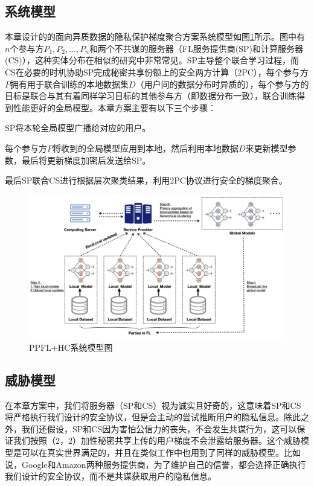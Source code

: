 \subsection{系统模型}
本章设计的的面向异质数据的隐私保护梯度聚合方案系统模型如图\ref{sysjpg}所示。图中有$n$个参与方$P_1,P_2,...,P_n$和两个不共谋的服务器（FL服务提供商(SP)和计算服务器(CS)），这种实体分布在相似的研究\cite{liu2021privacy, dong2021flod, hao2021efficient}中非常常见。SP主导整个联合学习过程，而CS在必要的时机协助SP完成秘密共享份额上的安全两方计算（2PC），每个参与方$P$拥有用于联合训练的本地数据集$D$（用户间的数据分布时异质的），每个参与方的目标是联合与其有着同样学习目标的其他参与方（即数据分布一致），联合训练得到性能更好的全局模型。本章方案主要有以下三个步骤：
\begin{compactenum}
    \item SP将本轮全局模型广播给对应的用户。
    \item 每个参与方$P$将收到的全局模型应用到本地，然后利用本地数据$D$来更新模型参数，最后将更新梯度加密后发送给SP。
    \item 最后SP联合CS进行根据层次聚类结果，利用2PC协议进行安全的梯度聚合。
\end{compactenum}


\begin{figure}[htbp]
    \begin{center}
        \includegraphics[scale=0.13]{figures/work2figs/system-model.jpg}
        \caption{PPFL+HC系统模型图}
        \label{sysjpg}
    \end{center}
\end{figure}

\subsection{威胁模型}
在本章方案中，我们将服务器（SP和CS）视为诚实且好奇的，这意味着SP和CS将严格执行我们设计的安全协议，但是会主动的尝试推断用户的隐私信息。除此之外，我们还假设，SP和CS因为害怕公信力的丧失，不会发生共谋行为，这可以保证我们按照（2，2）加性秘密共享上传的用户梯度不会泄露给服务器。这个威胁模型是可以在真实世界满足的，并且在类似工作\cite{nguyen2022flame}中也用到了同样的威胁模型。比如说，Google和Amazon两种服务提供商，为了维护自己的信誉，都会选择正确执行我们设计的安全协议，而不是共谋获取用户的隐私信息。

